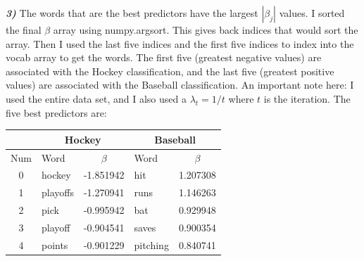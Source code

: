 \documentclass[10pt,letterpaper]{article}
\begin{document}
\textbf{\textit{3)}} The words that are the best predictors have the largest $|\beta_{j}|$ values.  I sorted the final $\beta$ array using numpy.argsort.  This gives back indices that would sort the array.  Then I used the last five indices and the first five indices to index into the vocab array to get the words.  The first five (greatest negative values) are associated with the Hockey classification, and the last five (greatest positive values) are associated with the Baseball classification.  An important note here: I used the entire data set, and I also used a $\lambda_t = 1 / t$ where $t$ is the iteration.
The five best predictors are:\\
\begin{tabular}{c|l|c||l|c}
  & \multicolumn{2}{|c||}{Hockey} & \multicolumn{2}{c}{Baseball}\\
  \hline
  Num & Word & $\beta$ & Word & $\beta$\\
  \hline
  0 & hockey & -1.851942 & hit & 1.207308\\
  1 & playoffs & -1.270941 & runs & 1.146263\\
  2 & pick & -0.995942 & bat & 0.929948\\
  3 & playoff & -0.904541 & saves & 0.900354\\
  4 & points & -0.901229 & pitching & 0.840741\\
\end{tabular}
\\
\\
\end{document}
